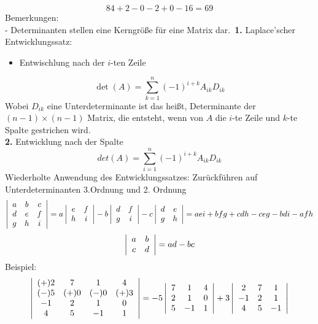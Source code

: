 \documentclass{article}
\begin{document}
\begin{equation*}
    84 + 2 - 0 - 2 + 0 - 16 = 69
\end{equation*}
Bemerkungen:\\
- Determinanten stellen eine Kerngröße für eine Matrix dar.\
\textbf{1.} Laplace'scher Entwicklungssatz:
\begin{itemize}
    \item Entwischlung nach der $i$-ten Zeile
\end{itemize}
\begin{equation*}
    \det(A)=\sum_{k=1}^{n} (-1)^{i+k} A_{ik} D_{ik}
\end{equation*}
Wobei $D_{ik}$ eine Unterdeterminante ist das heißt, Determinante der $(n-1)\times (n-1)$ Matrix, die entsteht, wenn von $A$ die $i$-te Zeile und $k$-te Spalte gestrichen wird.\\
\textbf{2.} Entwicklung nach der Spalte
\begin{equation*}
    det(A) = \sum_{i=1}^{n}(-1)^{i+k}A_{ik}D_{ik}
\end{equation*}
Wiederholte Anwendung des Entwicklungssatzes: Zurückführen auf Unterdeterminanten 3.Ordnung und 2. Ordnung
\begin{equation*}
    \left\lvert \begin{array}{c c c}a&b&c\\d&e&f\\g&h&i\end{array} \right\rvert = a \left\lvert \begin{array}{c c}e&f\\h&i\end{array} \right\rvert - b \left\lvert \begin{array}{c c}d&f\\g&i\end{array} \right\rvert - c \left\lvert \begin{array}{c c}d&e\\g&h\end{array} \right\rvert = aei + bfg + cdh - ceg - bdi - afh
\end{equation*}
\begin{equation*}
    \left\lvert \begin{array}{c c}a&b\\c&d\end{array} \right\rvert = ad-bc
\end{equation*}
Beispiel:
\begin{equation*}
    \left\lvert\begin{array}{c c c c}(+)2&7&1&4\\(-)5&(+)0&(-)0&(+)3\\-1&2&1&0\\4&5&-1&1\end{array} \right\rvert = -5 \left\lvert\begin{array}{c c c}7&1&4\\2&1&0\\5&-1&1\end{array} \right\rvert + 3 \left\lvert\begin{array}{c c c}2&7&1\\-1&2&1\\4&5&-1\end{array} \right\rvert
\end{equation*}
\end{document}
